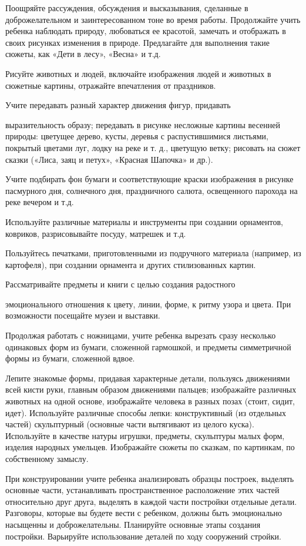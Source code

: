 \documentclass[a5paper]{book}
\begin{document}
Поощряйте рассуждения, обсуждения и высказывания, сделанные в
доброжелательном и заинтересованном тоне во время работы. Продолжайте
учить ребенка наблюдать природу, любоваться ее красотой, замечать и
отображать в своих рисунках изменения в природе. Предлагайте для
выполнения такие сюжеты, как «Дети в лесу», «Весна» и т.д.

Рисуйте животных и людей, включайте изображения людей и животных в
сюжетные картины, отражайте впечатления от праздников.

Учите передавать разный характер движения фигур, придавать

выразительность образу; передавать в рисунке несложные картины весенней
природы: цветущее дерево, кусты, деревья с распустившимися листьями,
покрытый цветами луг, лодку на реке и т. д., цветущую ветку; рисовать на
сюжет сказки («Лиса, заяц и петух», «Красная Шапочка» и др.).

Учите подбирать фон бумаги и соответствующие краски изображения в
рисунке пасмурного дня, солнечного дня, праздничного салюта, освещенного
парохода на реке вечером и т.д.

Используйте различные материалы и инструменты при создании орнаментов,
ковриков, разрисовывайте посуду, матрешек и т.д.

Пользуйтесь печатками, приготовленными из подручного материала
(например, из картофеля), при создании орнамента и других стилизованных
картин.

Рассматривайте предметы и книги с целью создания радостного

эмоционального отношения к цвету, линии, форме, к ритму узора и цвета.
При возможности посещайте музеи и выставки.

Продолжая работать с ножницами, учите ребенка вырезать сразу несколько
одинаковых форм из бумаги, сложенной гармошкой, и предметы симметричной
формы из бумаги, сложенной вдвое.

Лепите знакомые формы, придавая характерные детали, пользуясь движениями
всей кисти руки, главным образом движениями пальцев; изображайте
различных животных на одной основе, изображайте человека в разных позах
(стоит, сидит, идет). Используйте различные способы лепки:
конструктивный (из отдельных частей) скульптурный (основные части
вытягивают из целого куска). Используйте в качестве натуры игрушки,
предметы, скульптуры малых форм, изделия народных умельцев. Изображайте
сюжеты по сказкам, по картинкам, по собственному замыслу.

При конструировании учите ребенка анализировать образцы построек,
выделять основные части, устанавливать пространственное расположение
этих частей относительно друг друга, выделять в каждой части постройки
отдельные детали. Разговоры, которые вы будете вести с ребенком, должны
быть эмоционально насыщенны и доброжелательны. Планируйте основные этапы
создания постройки. Варьируйте использование деталей по ходу сооружений
стройки.
\end{document}
